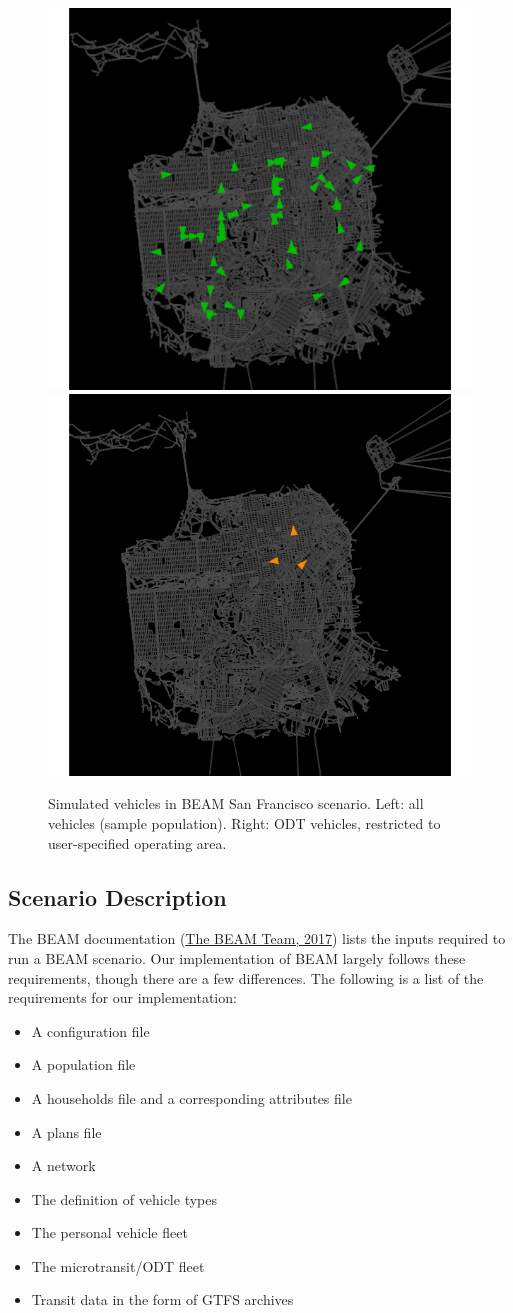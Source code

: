 \documentclass[
]{article}
\providecommand{\tightlist}{%
  \setlength{\itemsep}{0pt}\setlength{\parskip}{0pt}}
\begin{document}
\begin{figure}
\includegraphics[width=0.5\linewidth]{image/all_vehicles_in_san_fransisco} \includegraphics[width=0.5\linewidth]{image/odt_in_san_fransisco} \caption{Simulated vehicles in BEAM San Francisco scenario. Left: all vehicles (sample population). Right: ODT vehicles, restricted to user-specified operating area.}\label{fig:via-visualization}
\end{figure}

\hypertarget{scenario-description}{%
\subsection{Scenario Description}\label{scenario-description}}

The BEAM documentation (\protect\hyperlink{ref-beamdocs}{The BEAM Team, 2017}) lists the inputs required to run a BEAM scenario. Our implementation of BEAM largely follows these requirements, though there are a few differences. The following is a list of the requirements for our implementation:

\begin{itemize}
\tightlist
\item
  A configuration file
\item
  A population file
\item
  A households file and a corresponding attributes file
\item
  A plans file
\item
  A network
\item
  The definition of vehicle types
\item
  The personal vehicle fleet
\item
  The microtransit/ODT fleet
\item
  Transit data in the form of GTFS archives
\end{itemize}
\end{document}

